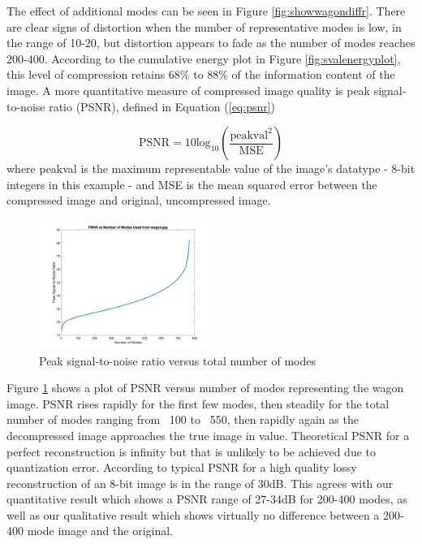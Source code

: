 \documentclass[conference]{IEEEtran}
\begin{document}
    The effect of additional modes can be seen in Figure \ref{fig:showwagondiffr}. There are clear signs of distortion when the number of representative modes is low, in the range of 10-20, but distortion appears to fade as the number of modes reaches 200-400. According to the cumulative energy plot in Figure \ref{fig:svalenergyplot}, this level of compression retains 68\% to 88\% of the information content of the image. A more quantitative measure of compressed image quality is peak signal-to-noise ratio (PSNR), defined in Equation (\ref{eq:psnr})

    \begin{equation}
    		\text{PSNR} = 10\text{log}_{10}\left(\frac{\text{peakval}^2}{\text{MSE}}\right)
    \label{eq:psnr}
    \end{equation}
    where peakval is the maximum representable value of the image's datatype - 8-bit integers in this example - and MSE is the mean squared error between the compressed image and original, uncompressed image.

	\begin{figure}[t]
        \includegraphics[width=0.5\textwidth]{snrvsr_wagon_rgb}
        \caption{Peak signal-to-noise ratio versus total number of modes}
        \label{fig:psnrvsr_wagon}
    \end{figure}
    
    Figure \ref{fig:psnrvsr_wagon} shows a plot of PSNR versus number of modes representing the wagon image. PSNR rises rapidly for the first few modes, then steadily for the total number of modes ranging from ~100 to ~550, then rapidly again as the decompressed image approaches the true image in value. Theoretical PSNR for a perfect reconstruction is infinity but that is unlikely to be achieved due to quantization error. According to \cite{psnr_quality} typical PSNR for a high quality lossy reconstruction of an 8-bit image is in the range of 30dB. This agrees with our quantitative result which shows a PSNR range of 27-34dB for 200-400 modes, as well as our qualitative result which shows virtually no difference between a 200-400 mode image and the original.
\end{document}
